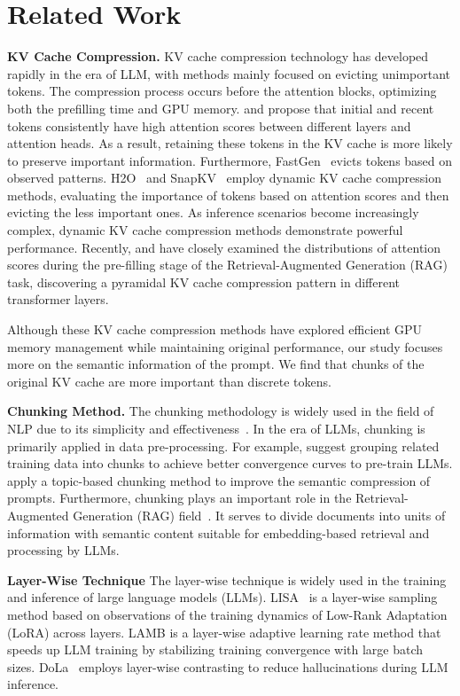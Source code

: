 \section{Related Work}
\textbf{KV Cache Compression.} KV cache compression technology has developed rapidly in the era of LLM, with methods mainly focused on evicting unimportant tokens. The compression process occurs before the attention blocks, optimizing both the prefilling time and GPU memory. \citet{xiao2024efficient} and \citet{han2024lm} propose that initial and recent tokens consistently have high attention scores between different layers and attention heads. As a result, retaining these tokens in the KV cache is more likely to preserve important information. Furthermore, FastGen~\citep{ge2023model} evicts tokens based on observed patterns. H2O~\citep{zhang2024h2o} and SnapKV~\citep{li2024snapkv} employ dynamic KV cache compression methods, evaluating the importance of tokens based on attention scores and then evicting the less important ones. As inference scenarios become increasingly complex, dynamic KV cache compression methods demonstrate powerful performance. Recently, \citet{yang2024pyramidinfer} and \citet{zhang2024pyramidkv} have closely examined the distributions of attention scores during the pre-filling stage of the Retrieval-Augmented Generation (RAG) task, discovering a pyramidal KV cache compression pattern in different transformer layers. 

Although these KV cache compression methods have explored efficient GPU memory management while maintaining original performance, our study focuses more on the semantic information of the prompt. We find that chunks of the original KV cache are more important than discrete tokens.
   
\textbf{Chunking Method.} 
The chunking methodology is widely used in the field of NLP due to its simplicity and effectiveness~\citep{sang1999representing}. In the era of LLMs, chunking is primarily applied in data pre-processing. For example, \citet{shicontext} suggest grouping related training data into chunks to achieve better convergence curves to pre-train LLMs. \citet{fei-etal-2024-extending} apply a topic-based chunking method to improve the semantic compression of prompts. Furthermore, chunking plays an important role in the Retrieval-Augmented Generation (RAG) field~\citep{yepes2024financialreportchunkingeffective, smith2024evaluating, anthropic_contextual_retrieval_2024}. It serves to divide documents into units of information with semantic content suitable for embedding-based retrieval and processing by LLMs.

\textbf{Layer-Wise Technique}
The layer-wise technique is widely used in the training and inference of large language models (LLMs). LISA~\citep{pan2024lisa} is a layer-wise sampling method based on observations of the training dynamics of Low-Rank Adaptation (LoRA)\citep{hu2021lora} across layers. LAMB\citep{you2019lamb} is a layer-wise adaptive learning rate method that speeds up LLM training by stabilizing training convergence with large batch sizes. DoLa~\citep{chuang2023dola} employs layer-wise contrasting to reduce hallucinations during LLM inference.